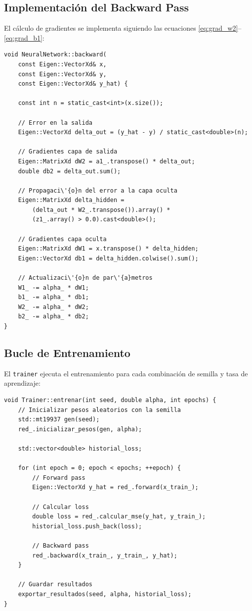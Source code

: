 \documentclass[12pt,a4paper]{article}
\theoremstyle{definition}
\begin{document}
\subsection{Implementaci\'{o}n del Backward Pass}

El c\'{a}lculo de gradientes se implementa siguiendo las ecuaciones \ref{eq:grad_w2}--\ref{eq:grad_b1}:

\begin{lstlisting}[caption={Backward Pass: c\'{a}lculo de gradientes.}]
void NeuralNetwork::backward(
    const Eigen::VectorXd& x,
    const Eigen::VectorXd& y,
    const Eigen::VectorXd& y_hat) {
    
    const int n = static_cast<int>(x.size());
    
    // Error en la salida
    Eigen::VectorXd delta_out = (y_hat - y) / static_cast<double>(n);
    
    // Gradientes capa de salida
    Eigen::MatrixXd dW2 = a1_.transpose() * delta_out;
    double db2 = delta_out.sum();
    
    // Propagaci\'{o}n del error a la capa oculta
    Eigen::MatrixXd delta_hidden = 
        (delta_out * W2_.transpose()).array() * 
        (z1_.array() > 0.0).cast<double>();
    
    // Gradientes capa oculta
    Eigen::MatrixXd dW1 = x.transpose() * delta_hidden;
    Eigen::VectorXd db1 = delta_hidden.colwise().sum();
    
    // Actualizaci\'{o}n de par\'{a}metros
    W1_ -= alpha_ * dW1;
    b1_ -= alpha_ * db1;
    W2_ -= alpha_ * dW2;
    b2_ -= alpha_ * db2;
}
\end{lstlisting}

\subsection{Bucle de Entrenamiento}

El \texttt{trainer} ejecuta el entrenamiento para cada combinaci\'{o}n de semilla y tasa de aprendizaje:

\begin{lstlisting}[caption={Bucle de entrenamiento con m\'{u}ltiples semillas.}]
void Trainer::entrenar(int seed, double alpha, int epochs) {
    // Inicializar pesos aleatorios con la semilla
    std::mt19937 gen(seed);
    red_.inicializar_pesos(gen, alpha);
    
    std::vector<double> historial_loss;
    
    for (int epoch = 0; epoch < epochs; ++epoch) {
        // Forward pass
        Eigen::VectorXd y_hat = red_.forward(x_train_);
        
        // Calcular loss
        double loss = red_.calcular_mse(y_hat, y_train_);
        historial_loss.push_back(loss);
        
        // Backward pass
        red_.backward(x_train_, y_train_, y_hat);
    }
    
    // Guardar resultados
    exportar_resultados(seed, alpha, historial_loss);
}
\end{lstlisting}
\end{document}

